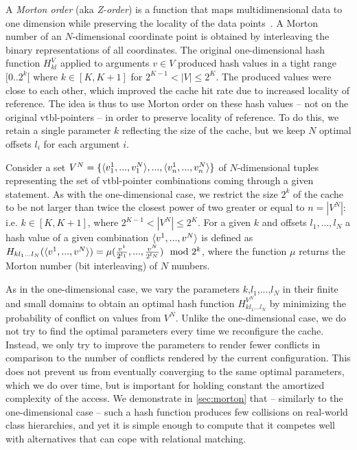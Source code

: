 A \emph{Morton order} (aka \emph{Z-order}) is a function that 
maps multidimensional data to one dimension while preserving the locality of the 
data points~\cite{Morton66}. A Morton number of an $N$-dimensional coordinate 
point is obtained by interleaving the binary representations of all coordinates.
The original one-dimensional hash function $H_{kl}^V$ applied to arguments $v \in V$ 
produced hash values in a tight range $[0..2^k[$ where $k \in [K,K+1]$ for 
$2^{K-1} < |V| \leq 2^K$. The produced values were close to each other, which 
improved the cache hit rate due to increased locality of reference. The 
idea is thus to use Morton order on these hash values -- not on the original 
vtbl-pointers -- in order to preserve locality of reference. To do this, we 
retain a single parameter $k$ reflecting the size of the cache, but we 
keep $N$ optimal offsets $l_i$ for each argument $i$.

Consider a set $V^N = \{\langle v_1^1,...,v_1^N\rangle,...,\langle v_n^1,...,v_n^N\rangle\}$ of 
$N$-dimensional tuples representing the set of vtbl-pointer combinations coming 
through a given  statement. As with the one-dimensional case, we 
restrict the size $2^k$ of the cache to be not larger than twice the closest 
power of two greater or equal to $n=|V^N|$: i.e. $k \in [K,K+1]$, where 
$2^{K-1} < |V^N| \leq 2^K$. For a given $k$ and offsets $l_1,...,l_N$ a hash 
value of a given combination $\langle v^1,...,v^N\rangle$ is defined as 
$H_{kl_1...l_N}(\langle v^1,...,v^N\rangle)=\mu(\frac{v^1}{2^{l_1}},...,\frac{v^N}{2^{l_N}}) \mod 2^k$, 
where the function $\mu$ returns the Morton number (bit interleaving) of $N$ numbers.
 
As in the one-dimensional case, we vary the parameters $k$,$l_1$,$...$,$l_N$ in 
their finite and small domains to obtain an optimal hash function 
$H^{V^N}_{kl_1...l_N}$ by minimizing the probability of conflict on values from 
$V^N$. Unlike the one-dimensional case, we do not try to find the optimal 
parameters every time we reconfigure the cache. Instead, we only try to improve 
the parameters to render fewer conflicts in comparison to the number of conflicts 
rendered by the current configuration. This does not prevent us from eventually 
converging to the same optimal parameters, which we do over time, but is 
important for holding constant the amortized complexity of the access. 
We demonstrate in \textsection\ref{sec:morton} that -- similarly to the one-dimensional 
case -- such a hash function produces few collisions on real-world class 
hierarchies, and yet it is simple enough to compute that it competes well with alternatives 
that can cope with relational matching.

